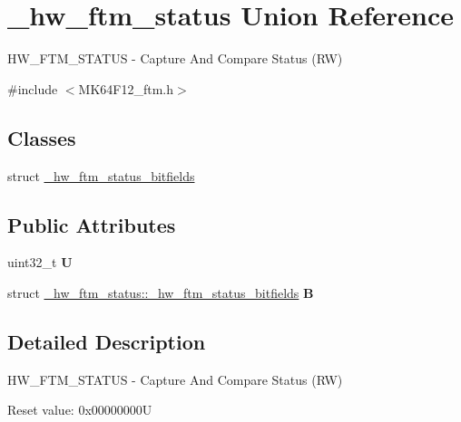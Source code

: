 \hypertarget{union__hw__ftm__status}{}\section{\+\_\+hw\+\_\+ftm\+\_\+status Union Reference}
\label{union__hw__ftm__status}


H\+W\+\_\+\+F\+T\+M\+\_\+\+S\+T\+A\+T\+US -\/ Capture And Compare Status (RW)  




{\ttfamily \#include $<$M\+K64\+F12\+\_\+ftm.\+h$>$}

\subsection*{Classes}
\begin{DoxyCompactItemize}
\item 
struct \hyperlink{struct__hw__ftm__status_1_1__hw__ftm__status__bitfields}{\+\_\+hw\+\_\+ftm\+\_\+status\+\_\+bitfields}
\end{DoxyCompactItemize}
\subsection*{Public Attributes}
\begin{DoxyCompactItemize}
\item 
uint32\+\_\+t {\bfseries U}\hypertarget{union__hw__ftm__status_a51cf5b42bf00386a29d6a7e84a0a3d2f}{}\label{union__hw__ftm__status_a51cf5b42bf00386a29d6a7e84a0a3d2f}

\item 
struct \hyperlink{struct__hw__ftm__status_1_1__hw__ftm__status__bitfields}{\+\_\+hw\+\_\+ftm\+\_\+status\+::\+\_\+hw\+\_\+ftm\+\_\+status\+\_\+bitfields} {\bfseries B}\hypertarget{union__hw__ftm__status_ae85e31bfa86f9d8a081d4c76c4690a2d}{}\label{union__hw__ftm__status_ae85e31bfa86f9d8a081d4c76c4690a2d}

\end{DoxyCompactItemize}


\subsection{Detailed Description}
H\+W\+\_\+\+F\+T\+M\+\_\+\+S\+T\+A\+T\+US -\/ Capture And Compare Status (RW) 

Reset value\+: 0x00000000U

